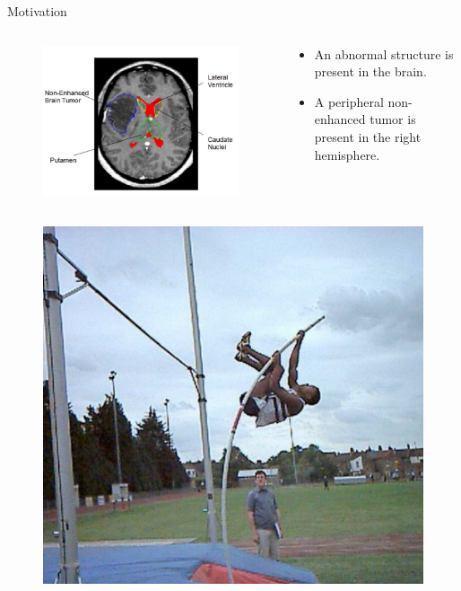 \documentclass{beamer}
\begin{document}
\begin{frame}{Motivation}
% 
%  
\begin{columns}
 \begin{column}{0.4\textwidth}
	\begin{figure}
	\includegraphics[width=.6\textwidth]{images/cerebrale.png}
	\end{figure}
	\end{column}
\begin{column}{0.6\textwidth}
 \begin{itemize}
  \item An abnormal structure is present in the brain.
  \item A peripheral non-enhanced tumor is present in the right hemisphere.
 \end{itemize}
\end{column}
\end{columns}

\begin{columns}
\begin{column}{0.4\textwidth}
  \begin{figure}
  \includegraphics[width=.4\textwidth]{figures/highjump.png}
  \end{figure}
\end{column}


\end{columns}
\end{frame}
\end{document}
